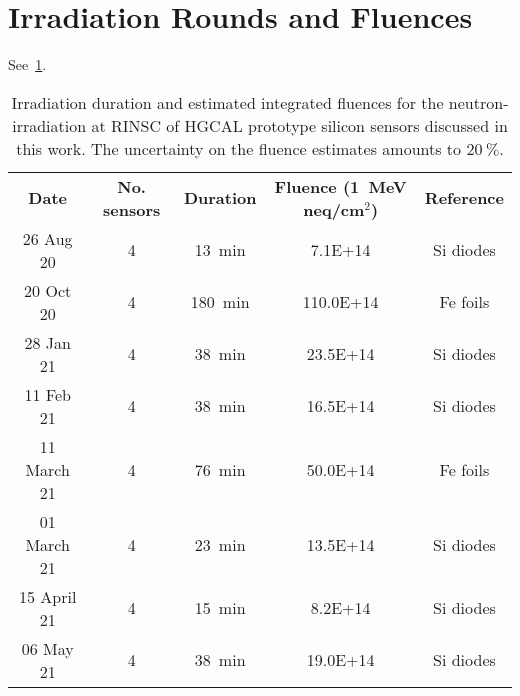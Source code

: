 \section{Irradiation Rounds and Fluences}
\label{appendix:irrad_rounds}
See~\ref{table:irrads}.
\begin{table}[h]
	\centering
	\begin{tabular}{c|cccc}
		\textbf{Date} & \textbf{No. sensors} & \textbf{Duration} & \textbf{Fluence (\SI{1}{\mega\eV} neq/cm$^2$)} & \textbf{Reference} \\
		26 Aug 20 & 4 & \SI{13}{\minute} & 7.1E+14 & Si diodes \\
		20 Oct 20 & 4 & \SI{180}{\minute} & 110.0E+14 & Fe foils \\
		28 Jan 21 & 4 & \SI{38}{\minute} & 23.5E+14 & Si diodes \\
		11 Feb 21 & 4 & \SI{38}{\minute} & 16.5E+14 & Si diodes \\
		11 March 21 & 4 & \SI{76}{\minute} & 50.0E+14 & Fe foils \\
		01 March 21 & 4 & \SI{23}{\minute} & 13.5E+14 & Si diodes \\
		15 April 21 & 4 & \SI{15}{\minute} & 8.2E+14 & Si diodes \\
		06 May 21 & 4 & \SI{38}{\minute} & 19.0E+14 & Si diodes \\
	\end{tabular}
	\caption{Irradiation duration and estimated integrated fluences for the neutron-irradiation at RINSC of HGCAL prototype silicon sensors discussed in this work.
	The uncertainty on the fluence estimates amounts to 20$~\%$.
	}
	\label{table:irrads}
\end{table}


